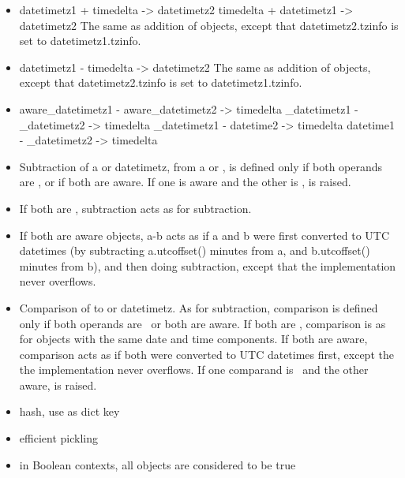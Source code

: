 \begin{itemize}
  \item
    datetimetz1 + timedelta -> datetimetz2
    timedelta + datetimetz1 -> datetimetz2
    The same as addition of  objects, except that
    datetimetz2.tzinfo is set to datetimetz1.tzinfo.

  \item
    datetimetz1 - timedelta -> datetimetz2
    The same as addition of  objects, except that
    datetimetz2.tzinfo is set to datetimetz1.tzinfo.

  \item
    aware_datetimetz1 - aware_datetimetz2 -> timedelta
    \naive\_datetimetz1 - \naive\_datetimetz2 -> timedelta
    \naive\_datetimetz1 - datetime2 -> timedelta
    datetime1 - \naive\_datetimetz2 -> timedelta

  \item
    Subtraction of a  or datetimetz, from a
     or , is defined only if both
    operands are \naive, or if both are aware.  If one is aware and
    the other is \naive,  is raised.

  \item
    If both are \naive, subtraction acts as for 
    subtraction.

  \item
    If both are aware  objects, a-b acts as if a and b were
    first converted to UTC datetimes (by subtracting a.utcoffset()
    minutes from a, and b.utcoffset() minutes from b), and then doing
     subtraction, except that the implementation never
    overflows.

  \item
    Comparison of  to  or datetimetz.  As for
    subtraction, comparison is defined only if both operands are
    \naive\ or both are aware.  If both are \naive, comparison is as
    for  objects with the same date and time components.
    If both are aware, comparison acts as if both were converted to
    UTC datetimes first, except the the implementation never
    overflows.  If one comparand is \naive\ and the other aware,
     is raised.

  \item
    hash, use as dict key

  \item
    efficient pickling

  \item
    in Boolean contexts, all  objects are considered to be
    true
\end{itemize}


